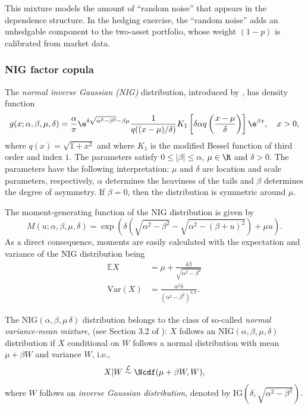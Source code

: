 This mixture models the amount of ``random noise'' that appears in the
dependence structure. In the hedging exercise, the
``random noise'' adds an unhedgable component to the two-asset portfolio, whose weight $(1-p)$ is calibrated from market data.

\subsubsection{NIG factor copula}

The {\em normal inverse Gaussian (NIG)\/} distribution, introduced by
\citep{BarndorffNielsen1997}, has density function
\begin{equation*}
  g(x; \alpha,\beta, \mu, \delta) = \frac{\alpha}{\pi} \e^{\delta
    \sqrt{\alpha^2-\beta^2} -\beta\mu} \frac{1}{q((x-\mu)/\delta)}
  K_1\left[\delta \alpha q\left(\frac{x-\mu}{\delta}\right) \right]
  \e^{\beta x},\quad x>0,
\end{equation*}
where $q(x) = \sqrt{1+x^2}$ and where $K_1$ is the modified Bessel
function of third order and index $1$. The parameters satisfy $0\leq
|\beta|\leq \alpha$, $\mu\in \R$ and $\delta>0$. The parameters have
the following interpretation: $\mu$ and $\delta$ are location and
scale parameters, respectively, $\alpha$ determines the heaviness of
the tails and $\beta$ determines the degree of asymmetry. If
$\beta=0$, then the distribution is symmetric around $\mu$.

The moment-generating function of the NIG distribution is given by
\begin{equation*}
  M(u; \alpha, \beta, \mu, \delta) = \exp\left( \delta
    \left(\sqrt{\alpha^2-\beta^2} - \sqrt{\alpha^2 - (\beta +
        u)^2}\right) + \mu u\right). 
\end{equation*}
As a direct consequence, moments are easily calculated with the
expectation and variance of the NIG distribution being
\begin{align}
  \label{eq:4}
  \mathbb E X &= \mu + 
                \frac{\delta \beta}{\sqrt{\alpha^2-\beta^2}}\\
  \label{eq:5}
  \text{Var}(X) &= \frac{\alpha^2\delta}{(\alpha^2-\beta^2)^{3/2}}.
\end{align}


The $\text{NIG}(\alpha, \beta, \mu\, \delta)$ distribution belongs to
the class of so-called {\em normal
variance-mean mixture},  (see Section 3.2 of
\citep{McNeil2005}): $X$ follows an
$\text{NIG}(\alpha,\beta,\mu,\delta)$ distribution if $X$ conditional
on $W$ follows a normal distribution with mean $\mu+\beta W$ and
variance $W$, i.e., 
\begin{equation*}
  X|W\stackrel{\mathcal L}\sim \Ncdf(\mu + \beta W, W),
\end{equation*}
where $W$ follows an {\em inverse Gaussian distribution}, denoted by
$\text{IG}(\delta, \sqrt{\alpha^2-\beta^2})$.


